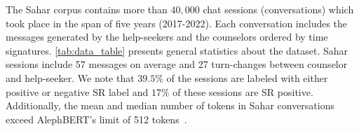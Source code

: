 \documentclass[letterpaper]{article} %
\newcommand{\kibitz}[2]{\ifnum\Comments=1{\textcolor{#1}{#2}}\fi}
\newcommand{\kg}[1]{\kibitz{red}{[KG:#1]}}
\newcommand{\di}[1]{\kibitz{blue}{[DI:#1]}}
\begin{document}
The Sahar corpus contains more than $40,000$  chat sessions (conversations) which took place in the span of  five years (2017-2022). Each conversation includes the  messages generated by the help-seekers and the counselors ordered by time signatures. \autoref{tab:data_table} presents general statistics about the dataset.  
Sahar sessions include 57 messages on average and 27 turn-changes between counselor and help-seeker. 
We note that $39.5\%$ of the sessions are labeled with either positive or negative SR label and $17\%$ of these sessions are SR positive. Additionally, the mean and median number of tokens in Sahar conversations exceed AlephBERT's limit of 512 tokens~\cite{seker2022alephbert}. 



\begin{table}[]
    \begin{center}{
    \caption{General statistics for Sahar corpus}
        \label{tab:data_table}
    }\end{center}
    
\end{table}
\end{document}
